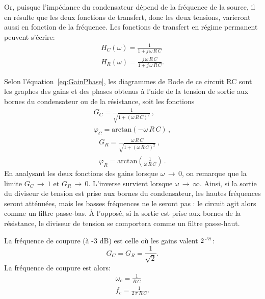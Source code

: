 \documentclass[canadien,12pt,oneside,letterpaper]{article}
\begin{document}
Or, puisque l'impédance du condensateur dépend de la fréquence de la source, il en résulte que les deux fonctions de transfert, donc les deux tensions, varieront aussi en fonction de la fréquence. Les fonctions de transfert en régime permanent peuvent s'écrire:
\begin{gather}
H_C\!\left(\omega\right)=\frac{1}{1+j\,\omega\,R\,C}\\
H_R\!\left(\omega\right)=\frac{j\,\omega\,R\,C}{1+j\,\omega\,R\,C}.
\end{gather}

Selon l'équation~\eqref{eq:GainPhase}, les diagrammes de Bode de ce circuit RC sont les graphes des gains et des phases obtenus à l'aide de la tension de sortie aux bornes du condensateur ou de la résistance, soit les fonctions
\begin{subequations}
\begin{gather}
G_C=\frac{1}{\sqrt{1+\left(\omega\,R\,C\right)^2}}\,,\\
\varphi_C=\mathrm{arctan}\!\left(-\omega\,R\,C\right)\,,
\end{gather}
\end{subequations}
\begin{subequations}
\begin{gather}
G_R=\frac{\omega\,R\,C}{\sqrt{1+\left(\omega\,R\,C\right)^2}}\,,\\
\varphi_R=\mathrm{arctan}\!\left(\frac{1}{\omega\,R\,C}\right)\,.
\end{gather}
\end{subequations}
En analysant les deux fonctions des gains lorsque $\omega\,\rightarrow\,0$, on remarque que la limite $G_C\,\rightarrow\,1$ et $G_R\,\rightarrow\,0$. L'inverse survient lorsque $\omega\,\rightarrow\,\infty$. Ainsi, si la sortie du diviseur de tension est prise aux bornes du condensateur, les hautes fréquences seront atténuées, mais les basses fréquences ne le seront pas : le circuit agit alors comme un filtre passe-bas. À l'opposé, si la sortie est prise aux bornes de la résistance, le diviseur de tension se comportera comme un filtre passe-haut.

La fréquence de coupure (à -3 dB) est celle où les gains valent $2^{\,\text{-\textonehalf}}$:
\begin{equation}
G_C=G_R=\frac{1}{\sqrt{2}}.
\end{equation}
La fréquence de coupure est alors:
\begin{subequations}
\begin{gather}
\omega_c=\frac{1}{R\,C}\\
f_c=\frac{1}{2\,\pi\,R\,C}.
\end{gather}
\end{subequations}
\end{document}
